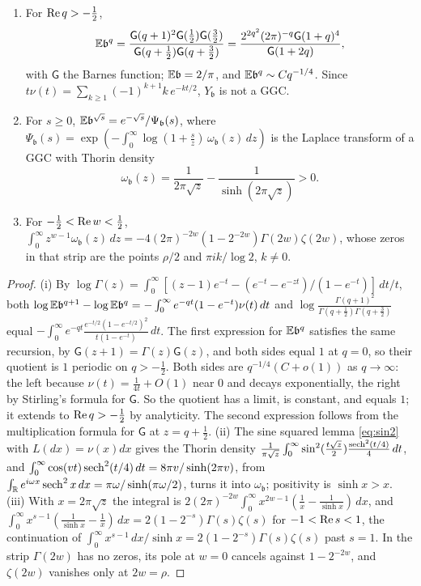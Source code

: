 \begin{proposition}\label{tx3:prop:barnes}
\begin{enumerate}
\item[(i)] For $\operatorname{Re} q>-\frac12$,
\[
\mathbb{E}\mathfrak b^q=\frac{\mathsf G(q+1)^2\mathsf G(\frac12)\mathsf G(\frac32)}{\mathsf G(q+\frac12)\mathsf G(q+\frac32)}=\frac{2^{2q^2}(2\pi)^{-q}\mathsf G(1+q)^4}{\mathsf G(1+2q)},
\]
with $\mathsf G$ the Barnes function; $\mathbb{E}\mathfrak b=2/\pi$, and $\mathbb{E}\mathfrak b^q\sim Cq^{-1/4}$. Since $t\nu(t)=\sum_{k\ge1}(-1)^{k+1}k\,e^{-kt/2}$, $Y_{\mathfrak b}$ is not a GGC.
\item[(ii)] For $s\ge0$, $\mathbb{E}\mathfrak b^{\sqrt s}=e^{-\sqrt s}/\Psi_{\mathfrak b}(s)$, where $\Psi_{\mathfrak b}(s)=\exp(-\int_0^\infty\log(1+\frac sz)\,\omega_{\mathfrak b}(z)\,dz)$ is the Laplace transform of a GGC with Thorin density
\[
\omega_{\mathfrak b}(z)=\frac1{2\pi\sqrt z}-\frac1{\sinh(2\pi\sqrt z)}>0 .
\]
\item[(iii)] For $-\frac12<\operatorname{Re} w<\frac12$, $\int_0^\infty z^{w-1}\omega_{\mathfrak b}(z)\,dz=-4(2\pi)^{-2w}(1-2^{-2w})\Gamma(2w)\zeta(2w)$, whose zeros in that strip are the points $\rho/2$ and $\pi ik/\log2$, $k\ne0$.
\end{enumerate}
\end{proposition}

\begin{proof}
(i) By $\log\Gamma(z)=\int_0^\infty[(z-1)e^{-t}-(e^{-t}-e^{-zt})/(1-e^{-t})]\,dt/t$, both $\log\mathbb{E}\mathfrak b^{q+1}-\log\mathbb{E}\mathfrak b^q=-\int_0^\infty e^{-qt}(1-e^{-t})\nu(t)\,dt$ and $\log\frac{\Gamma(q+1)^2}{\Gamma(q+\frac12)\Gamma(q+\frac32)}$ equal $-\int_0^\infty e^{-qt}\frac{e^{-t/2}(1-e^{-t/2})^2}{t(1-e^{-t})}\,dt$. The first expression for $\mathbb{E}\mathfrak b^q$ satisfies the same recursion, by $\mathsf G(z+1)=\Gamma(z)\mathsf G(z)$, and both sides equal $1$ at $q=0$, so their quotient is $1$ periodic on $q>-\frac12$. Both sides are $q^{-1/4}(C+o(1))$ as $q\to\infty$: the left because $\nu(t)=\frac1{4t}+O(1)$ near $0$ and decays exponentially, the right by Stirling's formula for $\mathsf G$. So the quotient has a limit, is constant, and equals $1$; it extends to $\operatorname{Re} q>-\frac12$ by analyticity. The second expression follows from the multiplication formula for $\mathsf G$ at $z=q+\frac12$. (ii) The sine squared lemma \eqref{eq:sin2} with $L(dx)=\nu(x)dx$ gives the Thorin density $\frac1{\pi\sqrt z}\int_0^\infty\sin^2(\frac{t\sqrt z}2)\frac{\operatorname{sech}^2(t/4)}4\,dt$, and $\int_0^\infty\cos(vt)\operatorname{sech}^2(t/4)\,dt=8\pi v/\sinh(2\pi v)$, from $\int_{\mathbb R}e^{i\omega x}\operatorname{sech}^2x\,dx=\pi\omega/\sinh(\pi\omega/2)$, turns it into $\omega_{\mathfrak b}$; positivity is $\sinh x>x$. (iii) With $x=2\pi\sqrt z$ the integral is $2(2\pi)^{-2w}\int_0^\infty x^{2w-1}(\frac1x-\frac1{\sinh x})\,dx$, and $\int_0^\infty x^{s-1}(\frac1{\sinh x}-\frac1x)\,dx=2(1-2^{-s})\Gamma(s)\zeta(s)$ for $-1<\operatorname{Re} s<1$, the continuation of $\int_0^\infty x^{s-1}\,dx/\sinh x=2(1-2^{-s})\Gamma(s)\zeta(s)$ past $s=1$. In the strip $\Gamma(2w)$ has no zeros, its pole at $w=0$ cancels against $1-2^{-2w}$, and $\zeta(2w)$ vanishes only at $2w=\rho$.
\end{proof}

